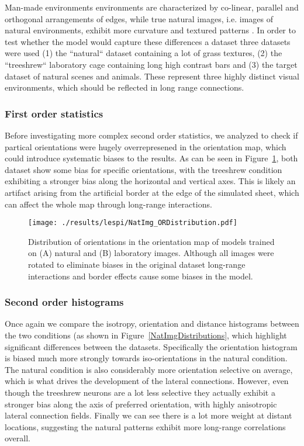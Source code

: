 Man-made environments environments are characterized by co-linear,
parallel and orthogonal arrangements of edges, while true natural
images, i.e. images of natural environments, exhibit more curvature
and textured patterns \citep{Perrinet2015}. In order to test whether
the model would capture these differences a dataset three datasets
were used (1) the ``natural`` dataset containing a lot of grass
textures, (2) the ``treeshrew`` laboratory cage containing long high
contrast bars and (3) the \citep{Serre2007} target dataset of natural
scenes and animals. These represent three highly distinct visual
environments, which should be reflected in long range connections.

\subsubsection{First order statistics}

Before investigating more complex second order statistics, we analyzed
to check if partical orientations were hugely overrepresened in the
orientation map, which could introduce systematic biases to the
results. As can be seen in Figure~\ref{NatImgORs}, both dataset show
some bias for specific orientations, with the treeshrew condition
exhibiting a stronger bias along the horizontal and vertical
axes. This is likely an artifact arising from the artificial border at
the edge of the simulated sheet, which can affect the whole map
through long-range interactions.

\begin{figure}
	\centering
    \texttt{[image: ./results/lespi/NatImg\_ORDistribution.pdf]}
	\caption[Distribution of orientations in the orientation map of
      models trained on natural and laboratory images.]{Distribution
      of orientations in the orientation map of models trained on (A)
      natural and (B) laboratory images. Although all images were
      rotated to eliminate biases in the original dataset long-range
      interactions and border effects cause some biases in the model.}
	\label{NatImgORs}
\end{figure}

\subsubsection{Second order histograms}

Once again we compare the isotropy, orientation and distance
histograms between the two conditions (as shown in
Figure~\ref{NatImgDistributions}, which highlight significant
differences between the datasets. Specifically the orientation
histogram is biased much more strongly towards iso-orientations in the
natural condition. The natural condition is also considerably more
orientation selective on average, which is what drives the development
of the lateral connections. However, even though the treeshrew neurons
are a lot less selective they actually exhibit a stronger bias along
the axis of preferred orientation, with highly anisotropic lateral
connection fields. Finally we can see there is a lot more weight at
distant locations, suggesting the natural patterns exhibit more
long-range correlations overall.

